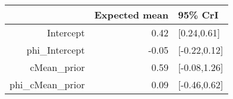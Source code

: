 \begin{tabular}{rrl}
  \hline
 & Expected mean & 95\% CrI \\ 
  \hline
Intercept & 0.42 & [0.24,0.61] \\ 
  phi\_Intercept & -0.05 & [-0.22,0.12] \\ 
  cMean\_prior & 0.59 & [-0.08,1.26] \\ 
  phi\_cMean\_prior & 0.09 & [-0.46,0.62] \\ 
   \hline
\end{tabular}

